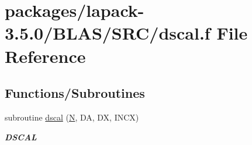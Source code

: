 \hypertarget{lapack-3_85_80_2BLAS_2SRC_2dscal_8f}{}\section{packages/lapack-\/3.5.0/\+B\+L\+A\+S/\+S\+R\+C/dscal.f File Reference}
\label{lapack-3_85_80_2BLAS_2SRC_2dscal_8f}
\subsection*{Functions/\+Subroutines}
\begin{DoxyCompactItemize}
\item 
subroutine \hyperlink{group__double__blas__level1_ga793bdd0739bbd0e0ec8655a0df08981a}{dscal} (\hyperlink{polmisc_8c_a0240ac851181b84ac374872dc5434ee4}{N}, D\+A, D\+X, I\+N\+C\+X)
\begin{DoxyCompactList}\small\item\em {\bfseries D\+S\+C\+A\+L} \end{DoxyCompactList}\end{DoxyCompactItemize}
